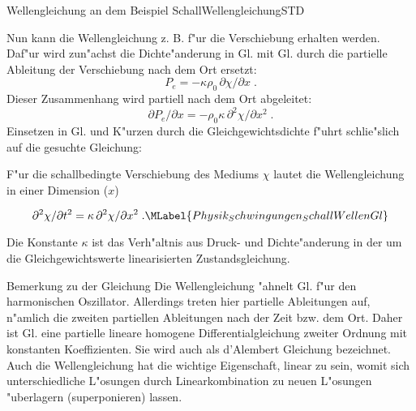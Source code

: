 \begin{MXContent}{Wellengleichung an dem Beispiel Schall}{Wellengleichung}{STD}
\begin{MInfo}
\end{MInfo}

Nun kann die Wellengleichung z. B. f"ur die Verschiebung erhalten werden. Daf"ur wird zun"achst die Dichte"anderung in Gl.  mit Gl.  durch die partielle Ableitung der Verschiebung nach dem Ort ersetzt:
\begin{equation}
  P_e = -\kappa \rho_0 \, \partial \chi / \partial x\; .
\end{equation}
Dieser Zusammenhang wird partiell nach dem Ort abgeleitet:
\begin{equation}
  \partial P_e / \partial x = -\rho_0 \kappa \, \partial^2 \chi / \partial x^2\; .
\end{equation}
Einsetzen in Gl.  und K"urzen durch die Gleichgewichtsdichte f"uhrt schlie"slich auf die gesuchte Gleichung:
\begin{MInfo}
F"ur die schallbedingte Verschiebung des Mediums $\chi$ lautet die Wellengleichung in einer Dimension ($x$)

\begin{equation}
  \partial^2 \chi / \partial t^2 = \kappa \, \partial^2 \chi / \partial x^2\; .\MLabel{Physik_Schwingungen_SchallWellenGl}
\end{equation}

Die Konstante $\kappa$ ist das Verh"altnis aus Druck- und Dichte"anderung in der um die Gleichgewichtswerte linearisierten Zustandsgleichung.
\end{MInfo}

  \begin{MHint}{Bemerkung zu der Gleichung}
  Die Wellengleichung "ahnelt Gl.  f"ur den harmonischen Oszillator. Allerdings treten hier partielle Ableitungen auf, n"amlich die zweiten partiellen Ableitungen nach der Zeit bzw. dem Ort. Daher ist Gl.  eine partielle lineare homogene Differentialgleichung zweiter Ordnung mit konstanten Koeffizienten. Sie wird auch als d'Alembert Gleichung bezeichnet. Auch die Wellengleichung hat die wichtige Eigenschaft, linear zu sein, womit sich unterschiedliche L"osungen durch Linearkombination zu neuen L"osungen "uberlagern (superponieren) lassen.
  \end{MHint}

\end{MXContent}


